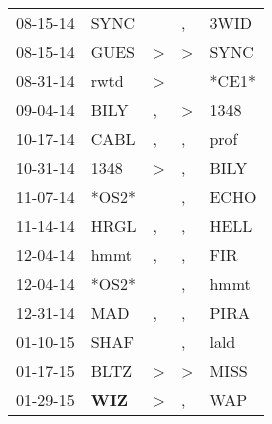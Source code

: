 \begin{supertabular}{p{0.07\textwidth}p{0.06\textwidth}p{0.02\textwidth}p{0.02\textwidth}p{0.06\textwidth}}
          08-15-14\textsuperscript{} &           SYNC\textsuperscript{} &                  &                , &           3WID\textsuperscript{} \\
          08-15-14\textsuperscript{} &           GUES\textsuperscript{} &     \textgreater &     \textgreater &           SYNC\textsuperscript{} \\
          08-31-14\textsuperscript{} &           rwtd\textsuperscript{} &     \textgreater &                  &                            *CE1* \\
          09-04-14\textsuperscript{} &           BILY\textsuperscript{} &                , &     \textgreater &           1348\textsuperscript{} \\
          10-17-14\textsuperscript{} &           CABL\textsuperscript{} &                , &                , &           prof\textsuperscript{} \\
          10-31-14\textsuperscript{} &           1348\textsuperscript{} &     \textgreater &                , &           BILY\textsuperscript{} \\
          11-07-14\textsuperscript{} &                            *OS2* &                  &                , &           ECHO\textsuperscript{} \\
          11-14-14\textsuperscript{} &           HRGL\textsuperscript{} &                , &                , &           HELL\textsuperscript{} \\
          12-04-14\textsuperscript{} &           hmmt\textsuperscript{} &                , &                , &            FIR\textsuperscript{} \\
          12-04-14\textsuperscript{} &                            *OS2* &                  &                , &           hmmt\textsuperscript{} \\
          12-31-14\textsuperscript{} &            MAD\textsuperscript{} &                , &                , &           PIRA\textsuperscript{} \\
          01-10-15\textsuperscript{} &           SHAF\textsuperscript{} &                  &                , &           lald\textsuperscript{} \\
          01-17-15\textsuperscript{} &           BLTZ\textsuperscript{} &     \textgreater &     \textgreater &           MISS\textsuperscript{} \\
          01-29-15\textsuperscript{} &   \textbf{WIZ\textsuperscript{}} &     \textgreater &                , &            WAP\textsuperscript{} \\

\end{supertabular}
